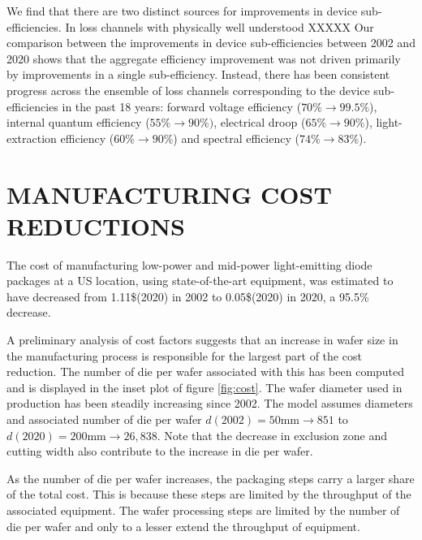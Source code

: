 \documentclass[a4paper,nocompress]{spie}  %
\begin{document}
     We find that there are two distinct sources for improvements in device sub-efficiencies. In loss channels with physically well understood  XXXXX Our comparison between the improvements in device sub-efficiencies between 2002 and 2020 shows that the aggregate efficiency improvement was not driven primarily by improvements in a single sub-efficiency. Instead, there has been consistent progress across the ensemble of loss channels corresponding to the device sub-efficiencies in the past 18 years: forward voltage efficiency ($70\%\rightarrow99.5\%$), internal quantum efficiency ($55\%\rightarrow90\%)$, electrical droop ($65\%\rightarrow90\%$), light-extraction efficiency ($60\%\rightarrow90\%$) and spectral efficiency ($74\% \rightarrow83\%$).

\section{MANUFACTURING COST REDUCTIONS}

    The cost of manufacturing low-power and mid-power light-emitting diode packages at a US location, using state-of-the-art equipment, was estimated to have decreased from 1.11\$(2020) in 2002 to 0.05\$(2020) in 2020, a 95.5\% decrease. 
    
    A preliminary analysis of cost factors suggests that an increase in wafer size in the manufacturing process is responsible for the largest part of the cost reduction. The number of die per wafer associated with this has been computed and is displayed in the inset plot of figure \ref{fig:cost}. The wafer diameter used in production has been steadily increasing since 2002. The model assumes diameters and associated number of die per wafer  $d(2002)=50$mm$\rightarrow851$ to $d(2020)=200$mm$\rightarrow26,838$. Note that the decrease in exclusion zone and cutting width also contribute to the increase in die per wafer.
    
    As the number of die per wafer increases, the packaging steps carry a larger share of the total cost. This is because these steps are limited by the throughput of the associated equipment. The wafer processing steps are limited by the number of die per wafer and only to a lesser extend the throughput of equipment.
    
\end{document}
